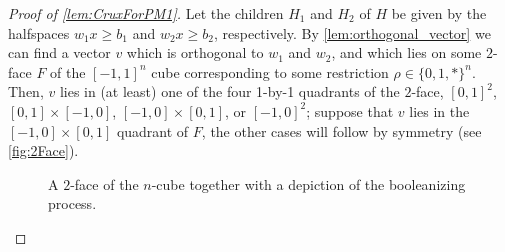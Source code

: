\begin{proof}[Proof of \autoref{lem:CruxForPM1}]
	Let the children $H_1$ and $H_2$ of $H$ be given by the halfspaces $w_1x \geq b_1$ and $w_2x \geq b_2$, respectively. By \autoref{lem:orthogonal_vector} we can find a vector $v$ which is orthogonal to $w_1$ and $w_2$, and which lies on some $2$-face $F$ of the $[-1,1]^n$ cube corresponding to some restriction $\rho \in \{0,1,*\}^n$. Then, $v$ lies in (at least) one of the four 1-by-1 quadrants of the $2$-face, $[0,1]^2$, $[0,1] \times [-1,0]$, $[-1,0] \times [0,1]$, or $[-1,0]^2$; suppose that $v$ lies in the $[-1,0] \times [0,1]$ quadrant of $F$, the other cases will follow by symmetry (see \autoref{fig:2Face}).
	
	
	\begin{figure}[H]
		\centering
		 \caption{A $2$-face of the $n$-cube together with a depiction of the booleanizing process.} \label{fig:2Face}	
	\end{figure}
	

\end{proof}
